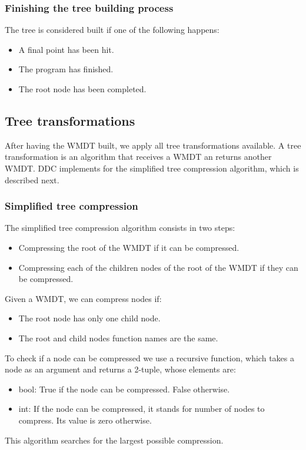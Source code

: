 \subsubsection{Finishing the tree building process}
The tree is considered built if one of the following happens:
\begin{itemize}
    \item A final point has been hit.
    \item The program has finished.
    \item The root node has been completed.
\end{itemize}
\subsection{Tree transformations}
After having the WMDT built, we apply all tree transformations available.
A tree transformation is an algorithm that receives a WMDT an returns another WMDT.
DDC implements for the simplified tree compression algorithm, which is described next.
\subsubsection{Simplified tree compression}
The simplified tree compression algorithm consists in two steps:
\begin{itemize}
    \item Compressing the root of the WMDT if it can be compressed.
    \item Compressing each of the children nodes of the root of the WMDT if they can be compressed.
\end{itemize}
Given a WMDT, we can compress nodes if:
\begin{itemize}
    \item The root node has only one child node.
    \item The root and child nodes function names are the same.
\end{itemize}
To check if a node can be compressed we use a recursive function, which takes a node as an argument and returns a 2-tuple, whose elements are:
\begin{itemize}
    \item bool: True if the node can be compressed. False otherwise.
    \item int: If the node can be compressed, it stands for number of nodes to compress. Its value is zero otherwise.
\end{itemize}

This algorithm searches for the largest possible compression.

